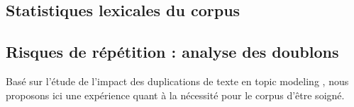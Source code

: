 \subsection{Statistiques lexicales du corpus}
\label{subsec:corpus_lexical_stats}

\subsection{Risques de répétition : analyse des doublons}
\label{subsec:corpus_repetition}

Basé sur l'étude de l'impact des duplications de texte en topic modeling \cite{schofield2017quantifying}, nous proposons ici une expérience
quant à la nécessité pour le corpus d'être soigné.